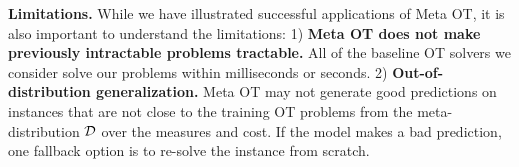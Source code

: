 \documentclass{article}
\begin{document}
\textbf{Limitations.}
While we have illustrated successful applications of Meta OT,
it is also important to understand the limitations:
1) \textbf{Meta OT does not make previously intractable
problems tractable.}
All of the baseline OT solvers we consider solve
our problems within milliseconds or seconds.
2) \textbf{Out-of-distribution generalization.}
Meta OT may not generate good predictions on instances
that are not close to the training OT problems from the
meta-distribution ${\mathcal{D}}$ over the measures and cost.
If the model makes a bad prediction,
one fallback option is to re-solve the instance from scratch.



{\small


}

\iffalse
\end{document}
